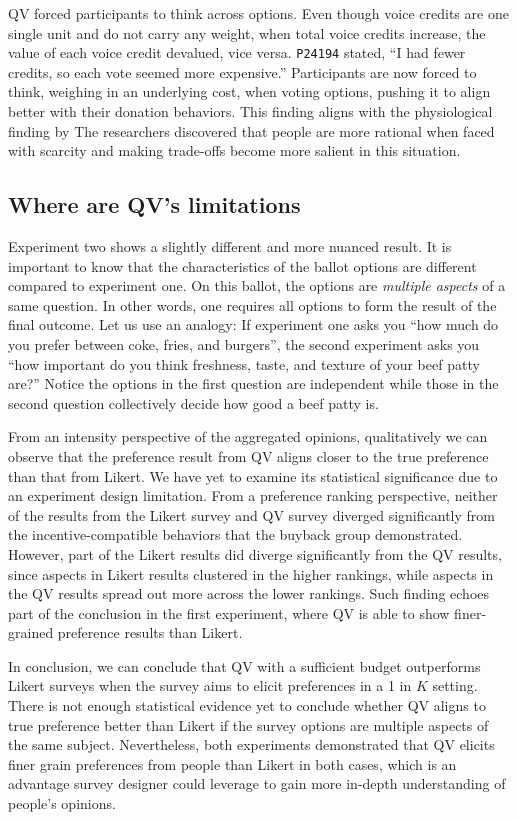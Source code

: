 QV forced participants to think across options. 
Even though voice credits are one single unit 
and do not carry any weight, 
when total voice credits increase, 
the value of each voice credit devalued, 
vice versa. 
\texttt{P24194} stated, 
``I had fewer credits, so each vote seemed more expensive.''
Participants are now forced to think, weighing in an underlying cost, when voting options, pushing it to align better with their donation behaviors.
This finding aligns with the physiological finding by \textcite{Shah2015a}
The researchers discovered that people are more rational when faced with scarcity and making trade-offs become more salient in this situation.


\subsection{Where are QV's limitations}
Experiment two shows a slightly different and more nuanced result.
It is important to know that
the characteristics of the ballot options 
are different compared to experiment one.
On this ballot, the options are \textit{multiple aspects}
of a same question.
In other words, 
one requires all options 
to form the result of the final outcome.
Let us use an analogy:
If experiment one asks you
``how much do you prefer between
coke, fries, and burgers'',
the second experiment asks you
``how important do you think
freshness, taste, and texture 
of your beef patty are?''
Notice the options in the first question 
are independent while 
those in the second question 
collectively decide how good a beef patty is.

From an intensity perspective 
of the aggregated opinions, 
qualitatively we can observe that 
the preference result from QV aligns closer 
to the true preference than that from Likert. 
We have yet to examine its statistical significance 
due to an experiment design limitation. 
From a preference ranking perspective, 
neither of the results from the Likert survey 
and QV survey
diverged significantly 
from the incentive-compatible behaviors 
that the buyback group demonstrated. 
However, part of the Likert results 
did diverge significantly from the QV results, 
since aspects in Likert results clustered 
in the higher rankings, 
while aspects in the QV results 
spread out more across the lower rankings. 
Such finding echoes part of the conclusion 
in the first experiment, 
where QV is able to show finer-grained preference results 
than Likert.

In conclusion,
we can conclude that QV with a sufficient budget outperforms Likert surveys when the survey aims to elicit preferences in a 1 in $K$ setting.
There is not enough statistical evidence yet to conclude whether QV aligns to true preference better than Likert if the survey options are multiple aspects of the same subject. Nevertheless, both experiments demonstrated that QV elicits finer grain preferences from people than Likert in both cases, which is an advantage survey designer could leverage to gain more in-depth understanding of people's opinions.

